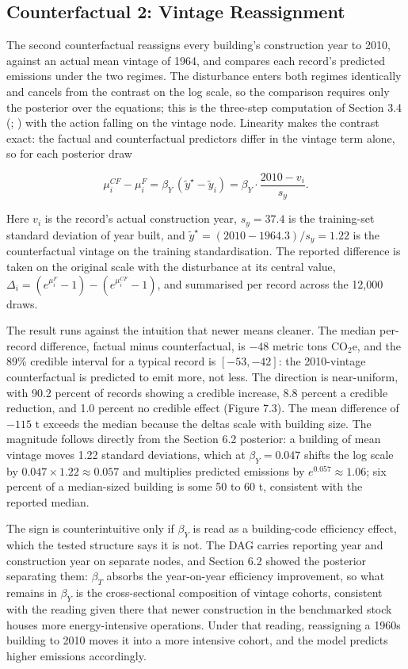 \subsection{Counterfactual 2: Vintage Reassignment}

The second counterfactual reassigns every building's construction year to 2010, against an actual mean vintage of 1964, and compares each record's predicted emissions under the two regimes. The disturbance enters both regimes identically and cancels from the contrast on the log scale, so the comparison requires only the posterior over the equations; this is the three-step computation of Section 3.4 (; ) with the action falling on the vintage node. Linearity makes the contrast exact: the factual and counterfactual predictors differ in the vintage term alone, so for each posterior draw

\[
\mu^{CF}_i - \mu^{F}_i = \beta_Y\,(\tilde{y}^\star - \tilde{y}_i) = \beta_Y \cdot \frac{2010 - v_i}{s_y}.
\]

Here $v_i$ is the record's actual construction year, $s_y = 37.4$ is the training-set standard deviation of year built, and $\tilde{y}^\star = (2010 - 1964.3)/s_y = 1.22$ is the counterfactual vintage on the training standardisation. The reported difference is taken on the original scale with the disturbance at its central value, $\Delta_i = (e^{\mu^F_i} - 1) - (e^{\mu^{CF}_i} - 1)$, and summarised per record across the 12,000 draws.

The result runs against the intuition that newer means cleaner. The median per-record difference, factual minus counterfactual, is $-48$ metric tons CO$_2$e, and the 89\% credible interval for a typical record is $[-53, -42]$: the 2010-vintage counterfactual is predicted to emit more, not less. The direction is near-uniform, with 90.2 percent of records showing a credible increase, 8.8 percent a credible reduction, and 1.0 percent no credible effect (Figure 7.3). The mean difference of $-115$ t exceeds the median because the deltas scale with building size. The magnitude follows directly from the Section 6.2 posterior: a building of mean vintage moves 1.22 standard deviations, which at $\beta_Y = 0.047$ shifts the log scale by $0.047 \times 1.22 \approx 0.057$ and multiplies predicted emissions by $e^{0.057} \approx 1.06$; six percent of a median-sized building is some 50 to 60 t, consistent with the reported median.

The sign is counterintuitive only if $\beta_Y$ is read as a building-code efficiency effect, which the tested structure says it is not. The DAG carries reporting year and construction year on separate nodes, and Section 6.2 showed the posterior separating them: $\beta_T$ absorbs the year-on-year efficiency improvement, so what remains in $\beta_Y$ is the cross-sectional composition of vintage cohorts, consistent with the reading given there that newer construction in the benchmarked stock houses more energy-intensive operations. Under that reading, reassigning a 1960s building to 2010 moves it into a more intensive cohort, and the model predicts higher emissions accordingly.

